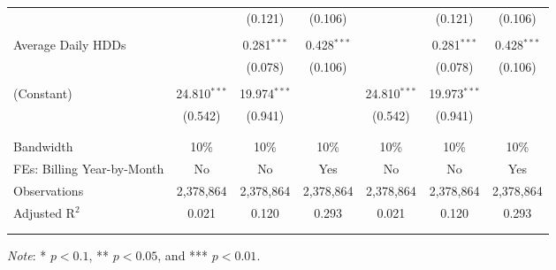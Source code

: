 {\begin{table}[t!]
\begin{adjustbox}{scale = 0.9}
\begin{threeparttable}
\begin{tabular}{@{\extracolsep{10pt}}lcccccc}
                    &  & (0.121) & (0.106) &  & (0.121) & (0.106) \\ 
                    & & & & & & \\ 
                    Average Daily HDDs &  & 0.281$^{***}$ & 0.428$^{***}$ &  & 0.281$^{***}$ & 0.428$^{***}$ \\ 
                    &  & (0.078) & (0.106) &  & (0.078) & (0.106) \\ 
                    & & & & & & \\ 
                    (Constant) & 24.810$^{***}$ & 19.974$^{***}$ &  & 24.810$^{***}$ & 19.973$^{***}$ &  \\ 
                    & (0.542) & (0.941) &  & (0.542) & (0.941) &  \\ 
                    & & & & & & \\
                    \hline
                    \\[-2.0ex]
                    Bandwidth & 10\% & 10\% & 10\% & 10\% & 10\% & 10\% \\ 
                    FEs: Billing Year-by-Month & No & No & Yes & No & No & Yes \\ 
                    Observations & 2,378,864 & 2,378,864 & 2,378,864 & 2,378,864 & 2,378,864 & 2,378,864 \\ 
                    Adjusted R$^{2}$ & 0.021 & 0.120 & 0.293 & 0.021 & 0.120 & 0.293 \\
                    \\[-2.0ex]
                    \hline \hline
                    \\[-4.5ex]
                \end{tabular}
                \begin{tablenotes}[flushleft]
                    \footnotesize
                    \item \textit{Note}: * $p < 0.1$, ** $p < 0.05$, and *** $p < 0.01$.
                \end{tablenotes}
            \end{threeparttable}
        \end{adjustbox}
    \end{table}
}
